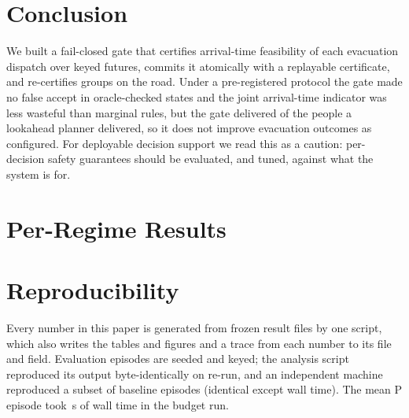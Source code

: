 \documentclass[letterpaper]{article}
\begin{document}
\section{Conclusion}

We built a fail-closed gate that certifies arrival-time feasibility of each evacuation dispatch over
keyed futures, commits it atomically with a replayable certificate, and re-certifies groups on the road.
Under a pre-registered protocol the gate made no false accept in \nQfourStates{} oracle-checked states and the joint arrival-time indicator was less
wasteful than marginal rules, but the gate delivered \nRpct{} of the people a lookahead planner delivered,
so it does not improve evacuation outcomes as configured. For deployable decision support we read this
as a caution: per-decision safety guarantees should be evaluated, and tuned, against what the system is
for.




\appendix
\section{Per-Regime Results}

\noindent\begin{minipage}{\columnwidth}
\centering\small
\setlength{\tabcolsep}{3pt}
\resizebox{\columnwidth}{!}{}
\label{tab:regimes}
\end{minipage}

\section{Reproducibility}
Every number in this paper is generated from frozen result files by one script, which also writes the
tables and figures and a trace from each number to its file and field. Evaluation episodes are seeded and
keyed; the analysis script reproduced its output byte-identically on re-run, and an independent machine
reproduced a subset of baseline episodes (identical except wall time). The mean P episode took
\nPEpisodeSeconds\,s of wall time in the budget run.
\end{document}
